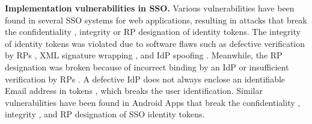 \noindent\textbf{Implementation vulnerabilities in SSO.}
Various vulnerabilities have been found in several SSO systems for web applications, resulting in attacks %
that break the confidentiality \cite{WangCW12,ccsSunB12,ArmandoCCCPS13,DiscoveringJCS,dimvaLiM16}, integrity \cite{WangCW12,SomorovskyMSKJ12,WangZLG16,MainkaMS16, MainkaMSW17,dimvaLiM16} or RP designation \cite{WangZLG16,MainkaMS16,MainkaMSW17,YangLCZ18,dimvaLiM16} of identity tokens.
The integrity of identity tokens was violated %
due to software flaws such as defective verification by RPs \cite{WangCW12,WangZLG16,MainkaMSW17}, XML signature wrapping \cite{SomorovskyMSKJ12}, and IdP spoofing \cite{MainkaMS16,MainkaMSW17}.
Meanwhile, the RP designation was broken because of incorrect binding by an IdP \cite{YangLCZ18,WangZLG16} or insufficient verification by RPs \cite{MainkaMS16,MainkaMSW17,YangLCZ18}.
A defective IdP does not always enclose an identifiable Email address in tokens \cite{WangCW12},
 which breaks the user identification.
Similar vulnerabilities have been found in Android Apps that break the confidentiality \cite{ChenPCTKT14,WangZLLYLG15,YangLS17,ShiWL19}, integrity \cite{ChenPCTKT14,YangLS17}, and RP designation \cite{ChenPCTKT14,ShiWL19,WangZLLYLG15} of SSO identity tokens.








